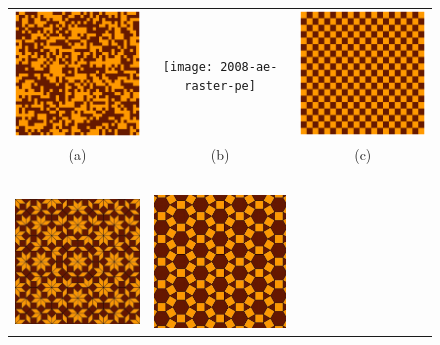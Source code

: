 \documentclass[rmp,amssymb,showpacs,showkeys,12pt,preprint]{revtex4}
\begin{document}
\begin{figure}
\begin{center}
\begin{tabular}{ccc}
 \includegraphics[width=5.23cm]{2008-ae-random}
&
 \texttt{[image: 2008-ae-raster-pe]}
&
 \includegraphics[width=5.23cm]{2008-ae-raster-diag}
\\
(a)&(b)&(c) \\
$\;$\\
 \includegraphics[width=5.00cm]{2008-ae-tiling}
&
 \includegraphics[width=5.00cm]{2008-ae-tess}

\end{tabular}
\end{center}
\end{figure}
\end{document}
